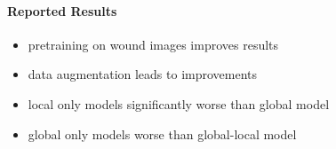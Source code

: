 \paragraph{Reported Results}

\begin{itemize}
	\item pretraining on wound images improves results
	\item data augmentation leads to improvements
	\item local only models significantly worse than global model
	\item global only models worse than global-local model
\end{itemize}



